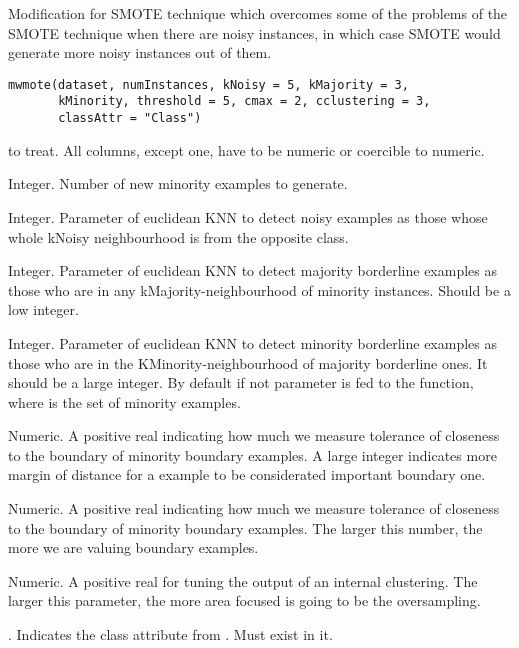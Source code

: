 
%
\begin{Description}\relax
Modification for SMOTE technique which overcomes some of the problems of the
SMOTE technique when there are noisy instances, in which case SMOTE would
generate more noisy instances out of them.
\end{Description}
%
\begin{Usage}
\begin{verbatim}
mwmote(dataset, numInstances, kNoisy = 5, kMajority = 3, 
       kMinority, threshold = 5, cmax = 2, cclustering = 3, 
       classAttr = "Class")
\end{verbatim}
\end{Usage}
%
\begin{Arguments}
\begin{ldescription}
\item[\code{dataset}]  to treat. All columns, except
 one, have to be numeric or coercible to numeric.

\item[\code{numInstances}] Integer. Number of new minority examples to generate.

\item[\code{kNoisy}] Integer. Parameter of euclidean KNN to detect noisy examples as
those whose whole kNoisy neighbourhood is from the opposite class.

\item[\code{kMajority}] Integer. Parameter of euclidean KNN to detect majority
borderline examples as those who are in any kMajority-neighbourhood of
minority instances. Should be a low integer.

\item[\code{kMinority}] Integer. Parameter of euclidean KNN to detect minority
borderline examples as those who are in the KMinority-neighbourhood of
majority borderline ones. It should be a large integer. By default if not
parameter is fed to the function,  where  is the
set of minority examples.

\item[\code{threshold}] Numeric. A positive real indicating how much we measure
tolerance of closeness to the boundary of minority boundary examples. A
large integer indicates more margin of distance for a example to be
considerated important boundary one.

\item[\code{cmax}] Numeric. A positive real indicating how much we measure tolerance
of closeness to the boundary of minority boundary examples. The larger this
number, the more we are valuing boundary examples.

\item[\code{cclustering}] Numeric. A positive real for tuning the output of an
internal clustering. The larger this parameter, the more area focused is
going to be the oversampling.

\item[\code{classAttr}] . Indicates the class attribute from
. Must exist in it.
\end{ldescription}
\end{Arguments}
